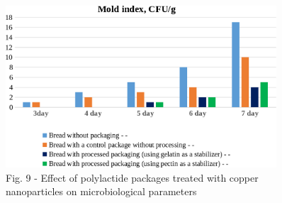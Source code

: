 \begin{figure}[H]
	\centering
	\includegraphics[width=0.9\textwidth]{assets/22.1}
	\caption*{Fig. 9 - Effect of polylactide packages treated with copper nanoparticles on microbiological parameters}
\end{figure}

